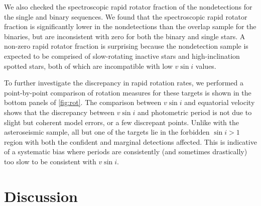 \documentclass[manuscript]{aastex6}
\newcommand{\vsini}{\ensuremath{v \sin i}}
\begin{document}
We also checked the spectroscopic rapid rotator fraction of the 
\citet{McQuillan14} nondetections for the single and binary sequences. We 
found that the spectroscopic rapid rotator fraction is significantly
lower in the nondetections than the overlap sample for the binaries, but are 
inconsistent with zero for both the binary and single stars. 
A non-zero rapid rotator fraction is surprising because the nondetection
sample is expected to be comprised of slow-rotating inactive stars and 
high-inclination spotted stars, both of which are incompatible with low 
\vsini{} values. 

\begin{figure*}
  \caption{\emph{Left:} APOGEE \vsini{} plotted against equatorial
  velocity computed from the rotation period and radius for targets with
  detected rapid rotation. Targets which are photometric binaries are plotted
  as large circles while targets which are on the single photometric sequence
  are plotted as small stars. The confirmed \vsini{} detections are shown
  in dark blue while the marginal \vsini{} detections are shown in light
  blue. The solid and dashed lines correspond to values where \(\sin i =
  1, 0.5\), respectively. The hatched area represents the forbidden
  region where \(\sin i > 1\). \emph{Middle:} Symbols are similar to left
  side, except points are projected such that the DSEP-derived radius is
  plotted against the radius inferred from \vsini{} and rotation
  period. \emph{Right:} Symbols are similar to left side, except points are
  projected such that the \citet{McQuillan14} period is plotted against the
  period inferred from the \vsini{} and radius.\label{fig:rot}}
\end{figure*}

To further investigate the discrepancy in rapid rotation rates, we
performed a point-by-point comparison of rotation measures for these 
targets is shown in the bottom panels of
\cref{fig:rot}. The comparison between \vsini{} and equatorial velocity shows
that the discrepancy between \vsini{} and photometric period is not due to slight
but coherent model errors, or a few discrepant points. Unlike with the
asteroseismic sample, all but one of the targets
lie in the forbidden \(\sin i > 1\) region with both the confident and
marginal detections affected. This is indicative of a systematic
bias where periods are consistently (and sometimes drastically) too slow to be
consistent with \vsini{}.

\section{Discussion}
\label{sec:discussion}
\end{document}

